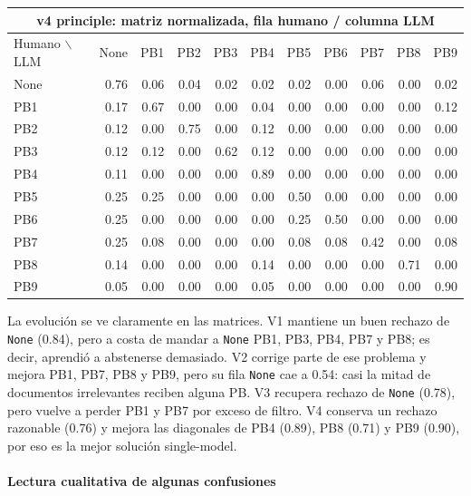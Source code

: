 \begin{center}
\tiny
\setlength{\tabcolsep}{2.4pt}
\renewcommand{\arraystretch}{1.05}
\begin{tabular}{lrrrrrrrrrr}
\toprule
\multicolumn{11}{c}{\textbf{v4 principle: matriz normalizada, fila humano / columna LLM}} \\
\midrule
Humano $\backslash$ LLM & None & PB1 & PB2 & PB3 & PB4 & PB5 & PB6 & PB7 & PB8 & PB9 \\
\midrule
None & 0.76 & 0.06 & 0.04 & 0.02 & 0.02 & 0.02 & 0.00 & 0.06 & 0.00 & 0.02 \\
PB1  & 0.17 & 0.67 & 0.00 & 0.00 & 0.04 & 0.00 & 0.00 & 0.00 & 0.00 & 0.12 \\
PB2  & 0.12 & 0.00 & 0.75 & 0.00 & 0.12 & 0.00 & 0.00 & 0.00 & 0.00 & 0.00 \\
PB3  & 0.12 & 0.12 & 0.00 & 0.62 & 0.12 & 0.00 & 0.00 & 0.00 & 0.00 & 0.00 \\
PB4  & 0.11 & 0.00 & 0.00 & 0.00 & 0.89 & 0.00 & 0.00 & 0.00 & 0.00 & 0.00 \\
PB5  & 0.25 & 0.25 & 0.00 & 0.00 & 0.00 & 0.50 & 0.00 & 0.00 & 0.00 & 0.00 \\
PB6  & 0.25 & 0.00 & 0.00 & 0.00 & 0.00 & 0.25 & 0.50 & 0.00 & 0.00 & 0.00 \\
PB7  & 0.25 & 0.08 & 0.00 & 0.00 & 0.00 & 0.08 & 0.08 & 0.42 & 0.00 & 0.08 \\
PB8  & 0.14 & 0.00 & 0.00 & 0.00 & 0.14 & 0.00 & 0.00 & 0.00 & 0.71 & 0.00 \\
PB9  & 0.05 & 0.00 & 0.00 & 0.00 & 0.05 & 0.00 & 0.00 & 0.00 & 0.00 & 0.90 \\
\bottomrule
\end{tabular}
\end{center}

La evolución se ve claramente en las matrices. V1 mantiene un buen rechazo de \texttt{None} (0.84), pero a costa de mandar a \texttt{None} PB1, PB3, PB4, PB7 y PB8; es decir, aprendió a abstenerse demasiado. V2 corrige parte de ese problema y mejora PB1, PB7, PB8 y PB9, pero su fila \texttt{None} cae a 0.54: casi la mitad de documentos irrelevantes reciben alguna PB. V3 recupera rechazo de \texttt{None} (0.78), pero vuelve a perder PB1 y PB7 por exceso de filtro. V4 conserva un rechazo razonable (0.76) y mejora las diagonales de PB4 (0.89), PB8 (0.71) y PB9 (0.90), por eso es la mejor solución single-model.

\paragraph{Lectura cualitativa de algunas confusiones}

